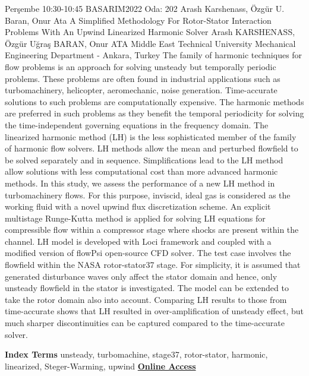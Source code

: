 
    \begin{abstract_basarim}
    {Perşembe 10:30-10:45}
    {BASARIM2022}
    {Oda: 202}
    {Arash Karshenass, Özgür U. Baran, Onur Ata}
    {A Simplified Methodology For Rotor-Stator Interaction Problems With An Upwind Linearized Harmonic Solver}
    {%
    Arash KARSHENASS, Özgür Uğraş BARAN, Onur ATA}
    {%
    }
    {%
    Middle East Technical University Mechanical Engineering Department - Ankara, Turkey}
    The family of harmonic techniques for flow problems is an approach for solving unsteady but temporally periodic problems. These problems are often found in industrial applications such as turbomachinery, helicopter, aeromechanic, noise generation. Time-accurate solutions to such problems are computationally expensive. The harmonic methods are preferred in such problems as they benefit the temporal periodicity for solving the time-independent governing equations in the frequency domain. The linearized harmonic method (LH) is the less sophisticated member of the family of harmonic flow solvers. LH methods allow the mean and perturbed flowfield to be solved separately and in sequence. Simplifications lead to the LH method allow solutions with less computational cost than more advanced harmonic methods. In this study, we assess the performance of a new LH method in turbomachinery flows. For this purpose, inviscid, ideal gas is considered as the working fluid with a novel upwind flux discretization scheme. An explicit multistage Runge-Kutta method is applied for solving LH equations for compressible flow within a compressor stage where shocks are present within the channel. LH model is developed with Loci framework and coupled with a modified version of flowPsi open-source CFD solver. The test case involves the flowfield within the NASA rotor-stator37 stage. For simplicity, it is assumed that generated disturbance waves only affect the stator domain and hence, only unsteady flowfield in the stator is investigated. The model can be extended to take the rotor domain also into account. Comparing LH results to those from time-accurate shows that LH resulted in over-amplification of unsteady effect, but much sharper discontinuities can be captured compared to the time-accurate solver. 
    
            \textbf{Index Terms} \newline{}unsteady, turbomachine, stage37, rotor-stator, harmonic, linearized, Steger-Warming, upwind
     \newline\newline\noindent \href{https://drive.google.com/file/d/1-EnT5MmzhSr_BGdovjyG6qJsGFGORFBA/view?usp=drivesdk}{\bfseries Online Access}
    \end{abstract_basarim}
    